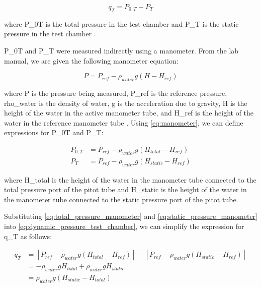 \begin{equation}\label{eq:dynamic_pressure_test_chamber}
    q_T = P_{0,T} - P_T
\end{equation}

\noindent{}where \gls{P_0T} is the total pressure in the test chamber and \gls{P_T} is the static pressure in the test chamber \citep{lab2-manual}.

\gls{P_0T} and \gls{P_T} were measured indirectly using a manometer. From the lab manual, we are given the following manometer equation:

\begin{equation}\label{eq:manometer}
    P = P_{ref} - \rho_{water} g \left(H - H_{ref}\right)
\end{equation}

\noindent{}where \gls{P} is the pressure being measured, \gls{P_ref} is the reference pressure, \gls{rho_water} is the density of water, \gls{g} is the acceleration due to gravity, \gls{H} is the height of the water in the active manometer tube, and \gls{H_ref} is the height of the water in the reference manometer tube \citep{lab2-manual}. Using \autoref{eq:manometer}, we can define expressions for \gls{P_0T} and \gls{P_T}:

\begin{align}
    P_{0,T} &= P_{ref} - \rho_{water} g \left(H_{total} - H_{ref}\right) \label{eq:total_pressure_manometer} \\
    P_T &= P_{ref} - \rho_{water} g \left(H_{static} - H_{ref}\right) \label{eq:static_pressure_manometer}
\end{align}

\noindent{}where \gls{H_total} is the height of the water in the manometer tube connected to the total pressure port of the pitot tube and \gls{H_static} is the height of the water in the manometer tube connected to the static pressure port of the pitot tube.

Substituting \autoref{eq:total_pressure_manometer} and \autoref{eq:static_pressure_manometer} into \autoref{eq:dynamic_pressure_test_chamber}, we can simplify the expression for \gls{q_T} as follows:

\begin{align}
    q_T &= \left[P_{ref} - \rho_{water} g \left(H_{total} - H_{ref}\right)\right] - \left[P_{ref} - \rho_{water} g \left(H_{static} - H_{ref}\right)\right] \nonumber \\
    &=-\rho_{water}gH_{total}+\rho_{water}gH_{static} \nonumber \\
    &=\rho_{water}g\left(H_{static} - H_{total}\right) \label{eq:dynamic_pressure_final}
\end{align}

